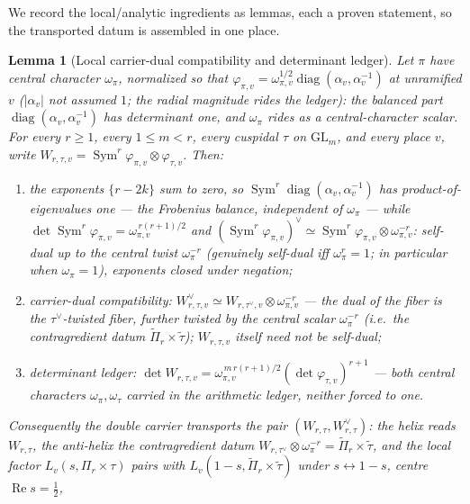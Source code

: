\documentclass[11pt]{article}
\newtheorem{lemma}[theorem]{Lemma}
\theoremstyle{definition}
\renewcommand{\Re}{\operatorname{Re}}
\newcommand{\Sym}{\operatorname{Sym}}
\begin{document}
We record the local/analytic ingredients as lemmas, each a proven statement, so the transported datum is
assembled in one place.

\begin{lemma}[Local carrier-dual compatibility and determinant ledger]\label{lem:selfdual}
Let $\pi$ have central character $\omega_\pi$, normalized so that $\varphi_{\pi,v}=\omega_{\pi,v}^{1/2}\operatorname{diag}(\alpha_v,\alpha_v^{-1})$ at unramified $v$ ($|\alpha_v|$ not assumed $1$; the radial magnitude rides the ledger): the balanced part $\operatorname{diag}(\alpha_v,\alpha_v^{-1})$ has determinant one, and
$\omega_\pi$ rides as a central-character scalar. For every $r\ge1$, every $1\le m<r$, every cuspidal $\tau$ on
$\mathrm{GL}_m$, and every place $v$, write $W_{r,\tau,v}=\Sym^r\varphi_{\pi,v}\otimes\varphi_{\tau,v}$. Then:
\begin{enumerate}
\item[\textup{(i)}] the exponents $\{r-2k\}$ sum to zero, so $\Sym^r\operatorname{diag}(\alpha_v,\alpha_v^{-1})$
has product-of-eigenvalues one --- the \emph{Frobenius balance}, independent of $\omega_\pi$ --- while
$\det\Sym^r\varphi_{\pi,v}=\omega_{\pi,v}^{\,r(r+1)/2}$ and $(\Sym^r\varphi_{\pi,v})^\vee\simeq
\Sym^r\varphi_{\pi,v}\otimes\omega_{\pi,v}^{-r}$: self-dual \emph{up to the central twist} $\omega_\pi^{-r}$
(genuinely self-dual iff $\omega_\pi^r=1$; in particular when $\omega_\pi=1$), exponents closed under negation;
\item[\textup{(ii)}] \emph{carrier-dual compatibility}: $W_{r,\tau,v}^\vee\simeq W_{r,\tau^\vee,v}\otimes
\omega_{\pi,v}^{-r}$ --- the dual of the fiber is the $\tau^\vee$-twisted fiber, further twisted by the central
scalar $\omega_\pi^{-r}$ (i.e.\ the contragredient datum $\widetilde\Pi_r\times\widetilde\tau$); $W_{r,\tau,v}$
itself \emph{need not} be self-dual;
\item[\textup{(iii)}] \emph{determinant ledger}: $\det W_{r,\tau,v}=\omega_{\pi,v}^{\,m\,r(r+1)/2}
(\det\varphi_{\tau,v})^{r+1}$ --- \emph{both} central characters $\omega_\pi,\omega_\tau$ carried in the
arithmetic ledger, neither forced to one.
\end{enumerate}
Consequently the double carrier transports the \emph{pair} $(W_{r,\tau},W_{r,\tau}^\vee)$: the helix reads
$W_{r,\tau}$, the anti-helix the contragredient datum $W_{r,\tau^\vee}\otimes\omega_\pi^{-r}=
\widetilde\Pi_r\times\widetilde\tau$, and the local factor $L_v(s,\Pi_r\times\tau)$ pairs with
$L_v(1-s,\widetilde\Pi_r\times\widetilde\tau)$ under $s\leftrightarrow1-s$, centre $\Re s=\tfrac12$,

\end{lemma}
\end{document}
